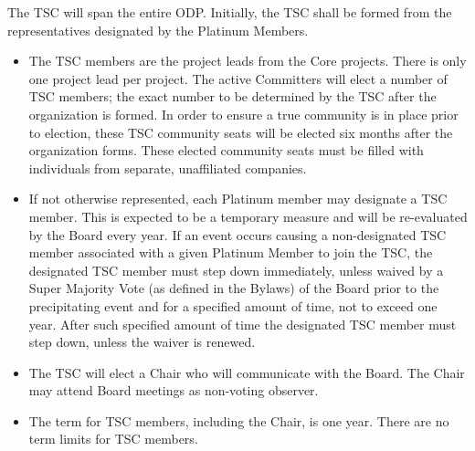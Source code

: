 \documentclass[a4paper, 12pt]{book}
\begin{document}
The TSC will span the entire ODP.  Initially, the TSC shall be formed from the representatives designated by the Platinum Members.
\begin{itemize}\itemsep0pt
\item{The TSC members are the project leads from the Core projects.  There is only one project lead per project. The active Committers will elect a number of TSC members; the exact number to be determined by the TSC after the organization is formed. In order to ensure a true community is in place prior to election, these TSC community seats will be elected six months after the organization forms. These elected community seats must be filled with individuals from separate, unaffiliated companies}.
\item{If not otherwise represented, each Platinum member may designate a TSC member. This is expected to be a temporary measure and will be re-evaluated by the Board every year. If an event occurs causing a non-designated TSC member associated with a given Platinum Member to join the TSC, the designated TSC member must step down immediately, unless waived by a Super Majority Vote (as defined in the Bylaws) of the Board prior to the precipitating event and for a specified amount of time, not to exceed one year. After such specified amount of time the designated TSC member must step down, unless the waiver is renewed}.
\item{The TSC will elect a Chair who will communicate with the Board.  The Chair may attend Board meetings as non-voting observer}.
\item{The term for TSC members, including the Chair, is one year.  There are no term limits for TSC members}.
\end{itemize}
\end{document}
